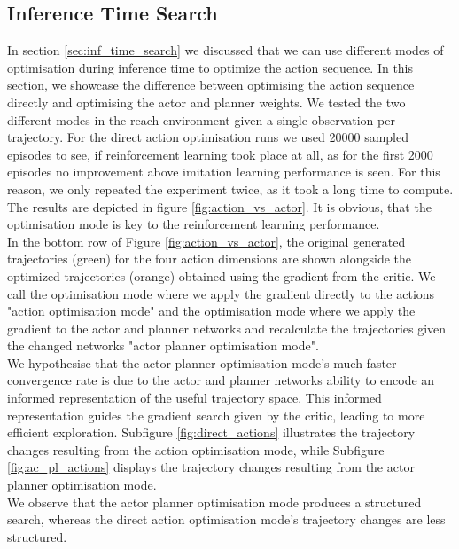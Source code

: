 \subsection{Inference Time Search}
\label{ref:com_opt_modes}
In section \ref{sec:inf_time_search} we discussed that we can use different modes of optimisation during inference time to optimize the action sequence. In this section, 
we showcase the difference between optimising the action sequence directly and optimising the actor and planner weights. We tested the two different 
modes in the reach environment given a single observation per trajectory. For the direct 
action optimisation runs we used 20000 sampled episodes to see, if reinforcement learning took place at all, as for the first 2000 episodes no improvement above 
imitation learning performance is seen. For this reason, we only repeated the experiment twice, as it took a long time to compute. The results are depicted in figure 
\ref{fig:action_vs_actor}. It is obvious, that the optimisation mode is key to the reinforcement learning performance. \\

In the bottom row of Figure \ref{fig:action_vs_actor}, the original generated trajectories (green) for the four action dimensions 
are shown alongside the optimized trajectories (orange) obtained using the gradient from the critic. We call the optimisation mode 
where we apply the gradient directly to the actions "action optimisation mode" and the optimisation mode where we apply 
the gradient to the actor and planner networks and recalculate the trajectories given the changed networks "actor planner 
optimisation mode".\\

We hypothesise that 
the actor planner optimisation mode's much faster convergence rate is due to the actor and planner networks ability to 
encode an informed representation of the useful trajectory space. This informed representation guides the gradient search 
given by the critic, leading to more efficient exploration. Subfigure \ref{fig:direct_actions} illustrates the trajectory 
changes resulting from the action optimisation mode, while Subfigure \ref{fig:ac_pl_actions} displays 
the trajectory changes resulting from the actor planner optimisation mode. \\

We observe that the actor planner 
optimisation mode produces a structured search, whereas the direct action optimisation mode's trajectory changes are less structured.\\

